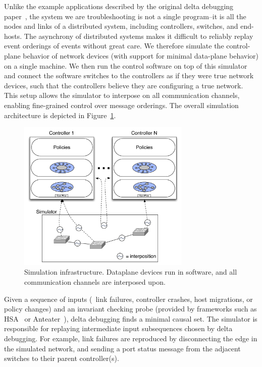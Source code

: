 Unlike the example applications described
by the original delta debugging paper~\cite{Zeller:1999:YMP:318773.318946}, the system we are troubleshooting is not a
single program--it is all the nodes and links of a distributed system,
including controllers, switches, and end-hosts. The asynchrony of distributed
systems makes it difficult to reliably replay event orderings of
events without great care. We therefore simulate the control-plane
behavior of network devices (with support for minimal data-plane behavior) on
a single machine. We then run the control software on
top of this simulator and connect the software switches to the controllers as if they were true
network devices, such that the controllers believe they are configuring a true
network. This setup allows the simulator to interpose on all communication
channels, enabling fine-grained control over message orderings. The overall
simulation architecture is depicted in
Figure~\ref{fig:architecture}.

\begin{figure}[t]
    \includegraphics[width=3.25in]{../diagrams/architecture/Debugger_Architecture.pdf}
    \caption[]{\label{fig:architecture} Simulation infrastructure. Dataplane
    devices run in software, and all communication channels are
    interposed upon.}
\end{figure}

Given a sequence of inputs (\eg~link failures, controller crashes, host migrations,
or policy changes) and an invariant checking probe (provided by frameworks
such as HSA~\cite{hsa,hsa_realtime} or Anteater~\cite{anteater,khurshid2012veriflow}),
delta debugging finds a minimal causal set. The
simulator is responsible for replaying intermediate input subsequences
chosen by delta debugging. For example, link failures are
reproduced by disconnecting the edge in the simulated network, and sending a
port status message from the adjacent switches to their parent controller(s).

